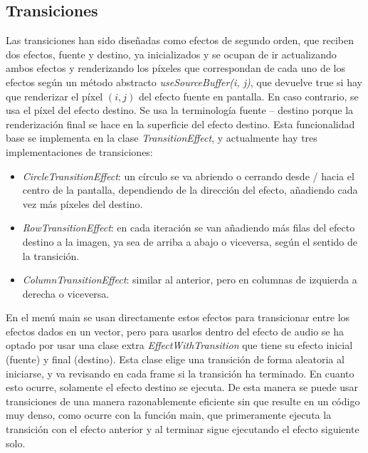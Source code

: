 \documentclass[12pt]{article}%
\begin{document}
\subsection{Transiciones}
	Las transiciones han sido diseñadas como efectos de segundo orden, que reciben dos efectos, fuente y destino, ya inicializados y se ocupan de ir actualizando ambos efectos y renderizando los píxeles que correspondan de cada uno de los efectos según un método abstracto \textit{useSourceBuffer(i, j)}, que devuelve true si hay que renderizar el píxel $(i, j)$ del efecto fuente en pantalla. En caso contrario, se usa el píxel del efecto destino. Se usa la terminología fuente -- destino porque la renderización final se hace en la superficie del efecto destino. Esta funcionalidad base se implementa en la clase \textit{TransitionEffect}, y actualmente hay tres implementaciones de transiciones:
	\begin{itemize}
		\item \textit{CircleTransitionEffect}: un círculo se va abriendo o cerrando desde / hacia el centro de la pantalla, dependiendo de la dirección del efecto, añadiendo cada vez más píxeles del destino.
		\item \textit{RowTransitionEffect}: en cada iteración se van añadiendo más filas del efecto destino a la imagen, ya sea de arriba a abajo o viceversa, según el sentido de la transición.
		\item \textit{ColumnTransitionEffect}: similar al anterior, pero en columnas de izquierda a derecha o viceversa.
	\end{itemize}
	
	En el menú main se usan directamente estos efectos para transicionar entre los efectos dados en un vector, pero para usarlos dentro del efecto de audio se ha optado por usar una clase extra \textit{EffectWithTransition} que tiene su efecto inicial (fuente) y final (destino). Esta clase elige una transición de forma aleatoria al iniciarse, y va revisando en cada frame si la transición ha terminado. En cuanto esto ocurre, solamente el efecto destino se ejecuta. De esta manera se puede usar transiciones de una manera razonablemente eficiente sin que resulte en un código muy denso, como ocurre con la función main, que primeramente ejecuta la transición con el efecto anterior y al terminar sigue ejecutando el efecto siguiente solo.
	
\end{document}
